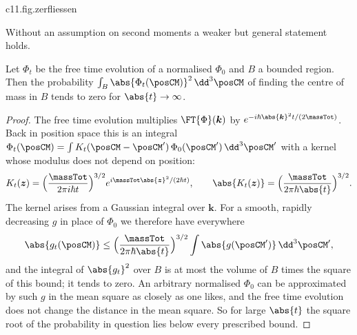 \begin{vertiefung}
  \begin{tpcfigure}{c11.fig.zerfliessen}
    \caption{The width of a free centre-of-mass packet according to
      \eqref{c11.eq.varianz}, relative to the initial width. Horizontally the time,
      measured in units of $\massTot\sqrt{\Var\posCM(0)}/\sqrt{\Var\boldsymbol{P}}$. The
      number $k$ is the expectation value in the middle term of \eqref{c11.eq.varianz},
      divided by $2\sqrt{\Var\posCM(0)\,\Var\boldsymbol{P}}$. Solid: $k = 0$. Dashed: a packet with
      $k < 0$, which first becomes narrower and then wider; the dot marks its smallest
      width. Thin: a line with the common asymptotic slope.}
  \end{tpcfigure}

  Without an assumption on second moments a weaker but general statement holds.

  \begin{proposition}\label{c11.prop.zerfliessen}
    Let $\Phi_t$ be the free time evolution of a normalised $\Phi_0$ and $B$ a bounded
    region. Then the probability $\int_B \abs{\Phi_t(\posCM)}^2 \,\dd^3\posCM$ of finding
    the centre of mass in $B$ tends to zero for $\abs{t} \to \infty$.
  \end{proposition}
  \begin{proof}
    The free time evolution multiplies $\FT{\Phi}(\boldsymbol{k})$ by
    $e^{-i\hbar\abs{\boldsymbol{k}}^2 t/(2\massTot)}$. Back in position space this is an
    integral $\Phi_t(\posCM) = \int K_t(\posCM - \posCM')\,\Phi_0(\posCM')\,\dd^3\posCM'$
    with a kernel whose modulus does not depend on position:
    \begin{equation}\label{c11.eq.freikern}
      K_t(\boldsymbol{z}) = \Bigl(\frac{\massTot}{2\pi i\hbar t}\Bigr)^{3/2}
        e^{i\massTot\abs{\boldsymbol{z}}^2/(2\hbar t)},
      \qquad
      \abs{K_t(\boldsymbol{z})} = \Bigl(\frac{\massTot}{2\pi\hbar\abs{t}}\Bigr)^{3/2}.
    \end{equation}
    The kernel arises from a Gaussian integral over $\boldsymbol{k}$. For a smooth,
    rapidly decreasing $g$ in place of $\Phi_0$ we therefore have everywhere
    \begin{equation}\label{c11.eq.schranke}
      \abs{g_t(\posCM)} \leq \Bigl(\frac{\massTot}{2\pi\hbar\abs{t}}\Bigr)^{3/2}
        \int \abs{g(\posCM')}\,\dd^3\posCM' ,
    \end{equation}
    and the integral of $\abs{g_t}^2$ over $B$ is at most the volume of $B$ times the
    square of this bound; it tends to zero. An arbitrary normalised $\Phi_0$ can be
    approximated by such $g$ in the mean square as closely as one likes, and the free
    time evolution does not change the distance in the mean square. So for large
    $\abs{t}$ the square root of the probability in question lies below every prescribed
    bound.
  \end{proof}


\end{vertiefung}
